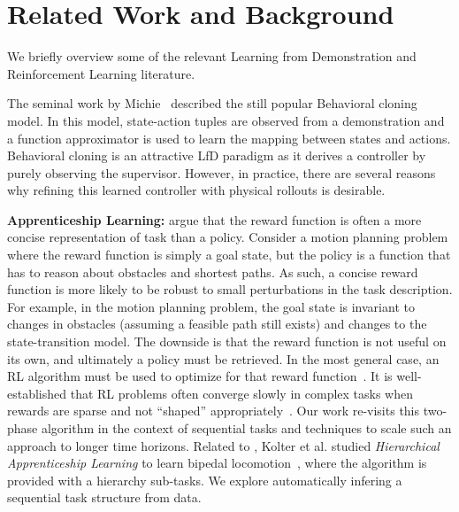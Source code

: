 %
\section{Related Work and Background}
We briefly overview some of the relevant Learning from Demonstration and Reinforcement Learning literature.

The seminal work by Michie~\cite{michie1996behavioural} described the still popular Behavioral cloning model.
In this model, state-action tuples are observed from a demonstration and a function approximator is used to learn the mapping
between states and actions.
Behavioral cloning is an attractive LfD paradigm as it derives a controller by purely observing the supervisor.
However, in practice, there are several reasons why refining this learned controller with physical rollouts is desirable.

\vspace{0.25em}\noindent\textbf{Apprenticeship Learning: } \cite{abbeel2004apprenticeship} argue that the reward function is often a more concise representation of task than a policy. Consider a motion planning problem where the reward function is simply a goal state, but the policy is a function that has to reason about obstacles and shortest paths. As such, a concise reward function is more likely to be robust to small perturbations in the task description. For example, in the motion planning problem, the goal state is invariant to changes in obstacles (assuming a feasible path still exists) and changes to the state-transition model. 
The downside is that the reward function is not useful on its own, and ultimately a policy must be retrieved. In the most general case, an RL algorithm must be used to optimize for that reward function~\citep{abbeel2004apprenticeship}.
It is well-established that RL problems often converge slowly in complex tasks when rewards are sparse and not ``shaped'' appropriately~\citep{DBLP:conf/icml/NgHR99, DBLP:conf/aaai/JudahFTG14}.
Our work re-visits this two-phase algorithm in the context of sequential tasks and techniques to scale such an approach to longer time horizons.
Related to \hirl, Kolter et al. studied  \emph{Hierarchical Apprenticeship Learning} to learn bipedal locomotion~\citep{DBLP:conf/nips/KolterAN07}, where the algorithm is provided with a hierarchy sub-tasks.
We explore automatically infering a sequential task structure from data.


